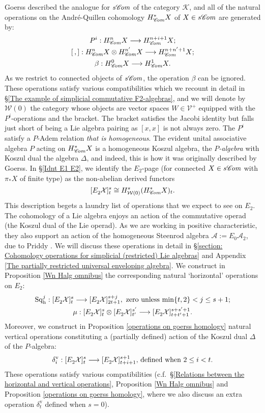 \documentclass[11pt]{amsart} \renewcommand{\baselinestretch}{1.2}
\theoremstyle{plain}
\numberwithin{equation}{section} %
\theoremstyle{plain}
\numberwithin{equation}{chapter} %
\renewcommand{\to}{\longrightarrow}
\newcommand{\scrC}{\mathscr{C}}
\newcommand{\calA}{\mathcal{A}}
\newcommand{\calV}{\mathcal{V}}
\newcommand{\calw}{\mathcal{W}}
\newcommand{\cala}{\mathcal{A}}
\newcommand{\calk}{\mathcal{K}}
\newcommand{\calx}{\mathcal{X}}
\newcommand{\vect}[2]{\calV^{#1}_{#2}}
\newcommand{\LieSteen}{\calA}
\newcommand{\algs}{{\scrC\!\textit{\normalfont\textit{om}}}}
\newcommand{\E}[5]{[E^{#1}_{#2}#3]^{#4}_{#5}}
\newcommand{\uver}{^\mathrm{v}}
\newcommand{\dhor}{_\mathrm{h}}
\newcommand{\Sqh}{\mathrm{Sq}\dhor}
\newcommand{\deltav}{\delta\uver}
\begin{document}
\begin{Introduction}
Goerss \cite{MR1089001} described the analogue for $s\algs$ of the category $\calk$, and  all of the natural operations on the Andr\'e-Quillen cohomology $H^*_\algs X$ of $X\in s\algs$ are generated by:
\begin{gather*}
P^i:H^n_{\algs}X\to H_{\algs}^{n+i+1}X;\\
[\,,]:H_{\algs}^nX\otimes H_{\algs}^{\smash{n'}}X\to H_{\algs}^{n+\smash{n'}+1}X;\\
\beta:H^0_{\algs}X\to H_{\algs}^{1}X.
\end{gather*}
As we restrict to connected objects of $s\algs$, the operation $\beta$ can be ignored.
These operations satisfy various compatibilities which we recount in detail in \S\ref{The example of simplicial commutative F2-algebras}, and we will denote by $\calw(0)$ the category whose objects are vector spaces $W\in\vect{+}{}$ equipped with the $P^i$-operations and the bracket.
The bracket satisfies the Jacobi identity but falls just short of being a Lie algebra pairing as $[x,x]$ is not always zero. The $P^i$ satisfy a $P$-Adem relation \emph{that is homogeneous}. The evident unital associative algebra $P$ acting on $H^{*}_{\algs}X$ is a homogeneous Koszul algebra, the \emph{$P$-algebra} with Koszul dual the algebra $\Delta$, and indeed, this is how it was originally described by Goerss. In \S\ref{Idnt E1 E2}, we identify the $E_2$-page (for connected $X\in s\algs$ with $\pi_*X$ of finite type) as the  non-abelian derived functors
\[\E{}{2}{\calx}{s}{t}\cong H^{s}_{\calw(0)}(H^{*}_{\algs}X)_t.\]
This description begets a laundry list of operations that we expect to see on $E_2$. The cohomology of a Lie algebra enjoys an action of the commutative operad (the Koszul dual of the Lie operad). As we are working in positive characteristic, they also support an action of the homogeneous Steenrod algebra $\LieSteen:=E_0\cala_2$, due to Priddy \cite{PriddySimplicialLie.pdf}. We will discuss these operations in detail in \S\ref{section: Cohomology operations for simplicial (restricted) Lie algebras} and Appendix \ref{The partially restricted universal enveloping algebra}. %
We construct in Proposition \ref{Wn Halg omnibus} the corresponding natural `horizontal' operations on $E_2$:
\begin{gather*}
\Sqh^j:\E{}{2}{\calx}{s}{t}\to \E{}{2}{\calx}{s+j}{2t+1},\textup{ zero unless $\min\{t,2\}< j\leq s+1$};\\
\mu:\E{}{2}{\calx}{s}{t}\otimes \E{}{2}{\calx}{s'}{t'}\to \E{}{2}{\calx}{s+s'+1}{t+t'+1}.
\end{gather*}
Moreover, we construct in Proposition \ref{operations on goerss homology} natural vertical operations constituting a  (partially defined) action of the Koszul dual $\Delta$ of the $P$-algebra:
\[\deltav_i:\E{}{2}{\calx}{s}{t}\to \E{}{2}{\calx}{s+1}{t+i+1}\textup{, defined when $2\leq i <t$}.\]%
These operations satisfy various compatibilities (c.f.\ \S\ref{Relations between the horizontal and vertical operations}, Proposition \ref{Wn Halg omnibus} and Proposition \ref{operations on goerss homology}, where we also discuss an extra operation $\deltav_t$ defined when $s=0$).


\end{Introduction}
\end{document}
